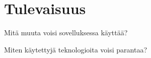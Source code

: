 \chapter{Tulevaisuus}%
\label{ch:tulevaisuus}

Mitä muuta voisi sovelluksessa käyttää?

Miten käytettyjä teknologioita voisi parantaa?
